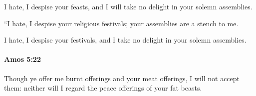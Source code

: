			\begin{versebox}
					\item[BHS] 
					\item[LXX] 
					\item[ASV] I hate, I despise your feasts, and I will take no delight in your solemn assemblies.
					\item[NIV] “I hate, I despise your religious festivals; your assemblies are a stench to me.
					\item[NRSV] I hate, I despise your festivals, and I take no delight in your solemn assemblies.
			\end{versebox}

		\paragraph{Amos 5:22} %
			\label{AMOS-5-22}

			Though ye offer me burnt offerings and your meat offerings, I will not accept them: neither will I regard the peace offerings of your fat beasts.

